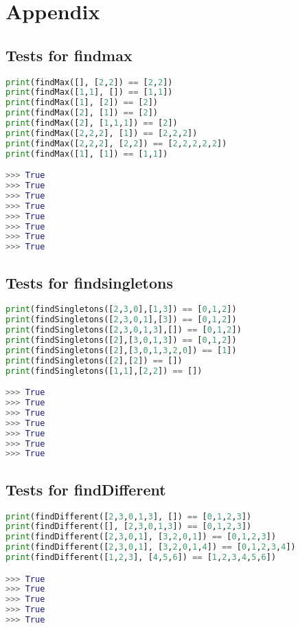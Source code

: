 \newpage
\section*{Appendix}
\subsection*{Tests for findmax}
\begin{lstlisting}[language = Python]
print(findMax([], [2,2]) == [2,2])
print(findMax([1,1], []) == [1,1])
print(findMax([1], [2]) == [2])
print(findMax([2], [1]) == [2])
print(findMax([2], [1,1,1]) == [2])
print(findMax([2,2,2], [1]) == [2,2,2])
print(findMax([2,2,2], [2,2]) == [2,2,2,2,2])
print(findMax([1], [1]) == [1,1])

>>> True
>>> True
>>> True
>>> True
>>> True
>>> True
>>> True
>>> True
\end{lstlisting}

\subsection*{Tests for findsingletons}
\begin{lstlisting}[language = Python]
print(findSingletons([2,3,0],[1,3]) == [0,1,2])
print(findSingletons([2,3,0,1],[3]) == [0,1,2])
print(findSingletons([2,3,0,1,3],[]) == [0,1,2])
print(findSingletons([2],[3,0,1,3]) == [0,1,2])
print(findSingletons([2],[3,0,1,3,2,0]) == [1])
print(findSingletons([2],[2]) == [])
print(findSingletons([1,1],[2,2]) == [])

>>> True
>>> True
>>> True
>>> True
>>> True
>>> True
>>> True
\end{lstlisting}

\subsection*{Tests for findDifferent}
\begin{lstlisting}[language = Python]
print(findDifferent([2,3,0,1,3], []) == [0,1,2,3])
print(findDifferent([], [2,3,0,1,3]) == [0,1,2,3])
print(findDifferent([2,3,0,1], [3,2,0,1]) == [0,1,2,3])
print(findDifferent([2,3,0,1], [3,2,0,1,4]) == [0,1,2,3,4])
print(findDifferent([1,2,3], [4,5,6]) == [1,2,3,4,5,6])

>>> True
>>> True
>>> True
>>> True
>>> True
\end{lstlisting}